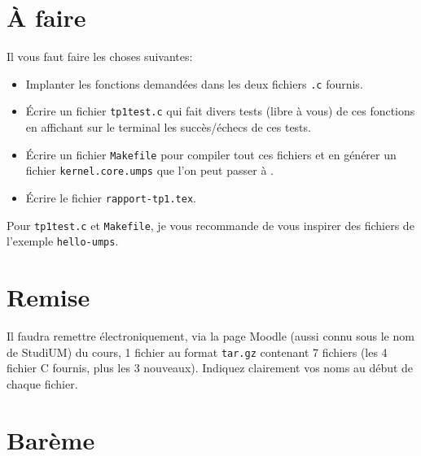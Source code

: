 \documentclass{article}
\begin{document}
\section{À faire}

Il vous faut faire les choses suivantes:
\begin{itemize}
\item Implanter les fonctions demandées dans les deux fichiers
  \texttt{.c} fournis.
\item Écrire un fichier \texttt{tp1test.c} qui fait divers tests (libre
  à vous) de ces fonctions en affichant sur le terminal les succès/échecs de
  ces tests.
\item Écrire un fichier \texttt{Makefile} pour compiler tout ces fichiers et
  en générer un fichier \texttt{kernel.core.umps} que l'on peut passer
  à \uMPS.
\item Écrire le fichier \texttt{rapport-tp1.tex}.
\end{itemize}
Pour \texttt{tp1test.c} et \texttt{Makefile}, je vous recommande de vous
inspirer des fichiers de l'exemple \texttt{hello-umps}.

\section{Remise}

Il faudra remettre électroniquement, via la page Moodle (aussi connu sous le
nom de StudiUM) du cours, 1 fichier au format \texttt{tar.gz} contenant
7 fichiers (les 4 fichier C fournis, plus les 3 nouveaux).
Indiquez clairement vos noms au début de chaque fichier.

\section{Barème}
\end{document}
